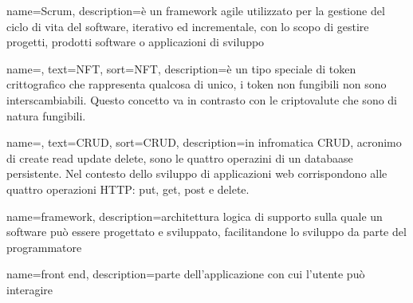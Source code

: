 {
	name={Scrum},
	description={è un framework agile utilizzato per la gestione del ciclo di vita del software, iterativo ed incrementale, con lo scopo di gestire progetti, prodotti software o applicazioni di sviluppo}
}

{
	name=,
	text=NFT,
	sort=NFT,
	description={è un tipo speciale di token crittografico che rappresenta qualcosa di unico, i token non fungibili non sono interscambiabili. Questo concetto va in contrasto con le criptovalute che sono di natura fungibili.}
}

{
	name=,
	text=CRUD,
	sort=CRUD,
	description={in infromatica CRUD, acronimo di create read update delete, sono le quattro operazini di un databaase persistente. Nel contesto dello sviluppo di applicazioni web corrispondono alle quattro operazioni HTTP: put, get, post e delete.}
}

{
	name={framework},
	description={architettura logica di supporto sulla quale un software può essere progettato e sviluppato, facilitandone lo sviluppo da parte del programmatore}
}

{
	name={front end},
	description={parte dell'applicazione con cui l'utente può interagire}
}

